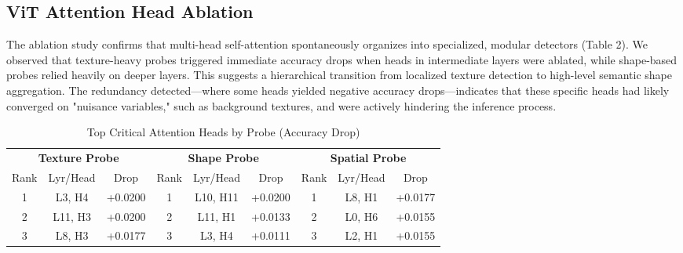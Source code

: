 \documentclass[12pt,a4paper]{article}
\begin{document}
\vspace{1.5em}

\subsection{ViT Attention Head Ablation}
The ablation study confirms that multi-head self-attention spontaneously organizes into specialized, modular detectors (Table 2). We observed that texture-heavy probes triggered immediate accuracy drops when heads in intermediate layers were ablated, while shape-based probes relied heavily on deeper layers. This suggests a hierarchical transition from localized texture detection to high-level semantic shape aggregation. The redundancy detected—where some heads yielded negative accuracy drops—indicates that these specific heads had likely converged on "nuisance variables," such as background textures, and were actively hindering the inference process.

\vspace{0.8em}

\begin{table}[H]
\centering
\caption{Top Critical Attention Heads by Probe (Accuracy Drop)}
\begin{tabular}{ccc|ccc|ccc}
\toprule
\multicolumn{3}{c|}{\textbf{Texture Probe}} & \multicolumn{3}{c|}{\textbf{Shape Probe}} & \multicolumn{3}{c}{\textbf{Spatial Probe}} \\
Rank & Lyr/Head & Drop & Rank & Lyr/Head & Drop & Rank & Lyr/Head & Drop \\
\midrule
1 & L3, H4 & +0.0200 & 1 & L10, H11 & +0.0200 & 1 & L8, H1 & +0.0177 \\
2 & L11, H3 & +0.0200 & 2 & L11, H1 & +0.0133 & 2 & L0, H6 & +0.0155 \\
3 & L8, H3 & +0.0177 & 3 & L3, H4 & +0.0111 & 3 & L2, H1 & +0.0155 \\
\bottomrule
\end{tabular}
\end{table}
\end{document}
